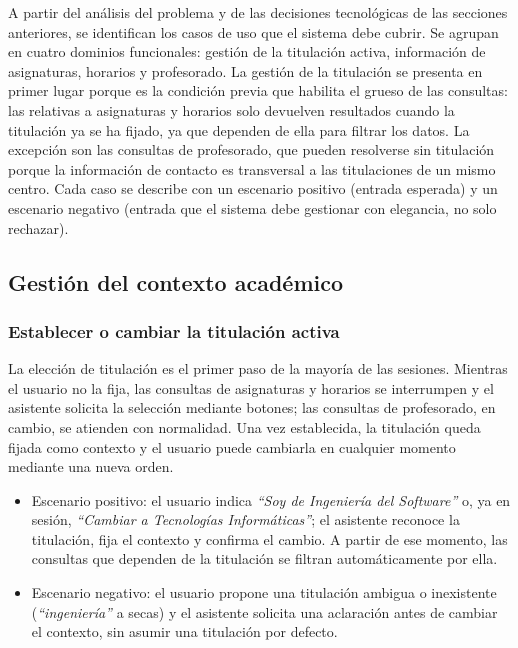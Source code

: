 A partir del análisis del problema y de las decisiones tecnológicas de las secciones anteriores, se identifican los casos de uso que el sistema debe cubrir. Se agrupan en cuatro dominios funcionales: gestión de la titulación activa, información de asignaturas, horarios y profesorado. La gestión de la titulación se presenta en primer lugar porque es la condición previa que habilita el grueso de las consultas: las relativas a asignaturas y horarios solo devuelven resultados cuando la titulación ya se ha fijado, ya que dependen de ella para filtrar los datos. La excepción son las consultas de profesorado, que pueden resolverse sin titulación porque la información de contacto es transversal a las titulaciones de un mismo centro. Cada caso se describe con un escenario positivo (entrada esperada) y un escenario negativo (entrada que el sistema debe gestionar con elegancia, no solo rechazar).

\subsection{Gestión del contexto académico}

\subsubsection{Establecer o cambiar la titulación activa}

La elección de titulación es el primer paso de la mayoría de las sesiones. Mientras el usuario no la fija, las consultas de asignaturas y horarios se interrumpen y el asistente solicita la selección mediante botones; las consultas de profesorado, en cambio, se atienden con normalidad. Una vez establecida, la titulación queda fijada como contexto y el usuario puede cambiarla en cualquier momento mediante una nueva orden.

\begin{itemize}
    \item Escenario positivo: el usuario indica \textit{``Soy de Ingeniería del Software''} o, ya en sesión, \textit{``Cambiar a Tecnologías Informáticas''}; el asistente reconoce la titulación, fija el contexto y confirma el cambio. A partir de ese momento, las consultas que dependen de la titulación se filtran automáticamente por ella.
    \item Escenario negativo: el usuario propone una titulación ambigua o inexistente (\textit{``ingeniería''} a secas) y el asistente solicita una aclaración antes de cambiar el contexto, sin asumir una titulación por defecto.
\end{itemize}


